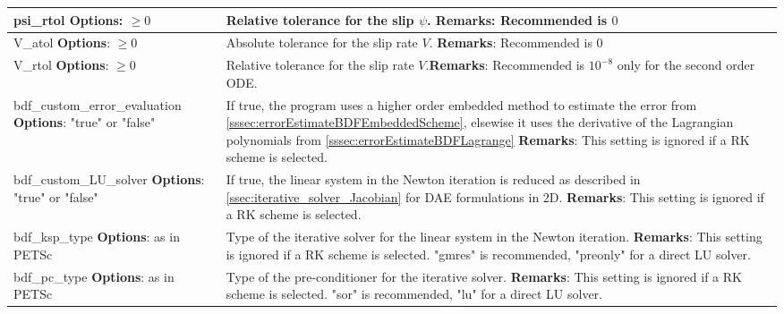 \begin{tabularx}{\textwidth}{| >{\raggedright\arraybackslash}m{} | >{\raggedright\arraybackslash}X |}
		psi\_rtol            \newline \textbf{Options}: $\ge0$
		& Relative tolerance for the slip $\psi$. \newline \textbf{Remarks}: Recommended is $0$ \\ \hline 
		V\_atol              \newline \textbf{Options}: $\ge0$
		& Absolute tolerance for the slip rate $V$. \newline \textbf{Remarks}:  Recommended is $0$ \\ \hline 
		V\_rtol              \newline \textbf{Options}: $\ge0$
		& Relative tolerance for the slip rate $V$.\newline \textbf{Remarks}:  Recommended is $10^{-8}$ only for the second order ODE. \\ \hline 
	    bdf\_custom\_error\_evaluation	\newline \textbf{Options}: "true" or "false"
	    & If true, the program uses a higher order embedded method to estimate the error from \autoref{sssec:errorEstimateBDFEmbeddedScheme}, elsewise it uses the derivative of the Lagrangian polynomials from \autoref{sssec:errorEstimateBDFLagrange} \newline \textbf{Remarks}: This setting is ignored if a RK scheme is selected. \\ \hline
		bdf\_custom\_LU\_solver         \newline \textbf{Options}: "true" or "false"
		& If true, the linear system in the Newton iteration is reduced as described in \autoref{ssec:iterative_solver_Jacobian} for DAE formulations in 2D. \newline \textbf{Remarks}: This setting is ignored if a RK scheme is selected. \\ \hline 
		bdf\_ksp\_type                  \newline \textbf{Options}: as in PETSc
		& Type of the iterative solver for the linear system in the Newton iteration. \newline \textbf{Remarks}: This setting is ignored if a RK scheme is selected. "gmres" is recommended, "preonly" for a direct LU solver. \\ \hline 
		bdf\_pc\_type                   \newline \textbf{Options}: as in PETSc
		& Type of the pre-conditioner for the iterative solver. \newline \textbf{Remarks}: This setting is ignored if a RK scheme is selected. "sor" is recommended, "lu" for a direct LU solver.\\

\end{tabularx}

